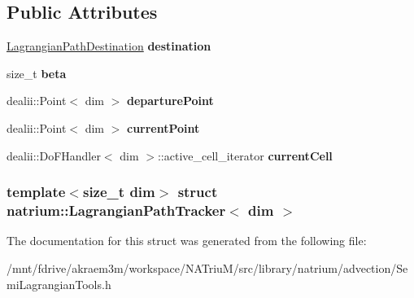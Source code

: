 \subsection*{Public Attributes}
\begin{DoxyCompactItemize}
\item 
\hypertarget{structnatrium_1_1LagrangianPathTracker_a64925522b60f5708255cc42423da9519}{
\hyperlink{structnatrium_1_1LagrangianPathDestination}{LagrangianPathDestination} {\bfseries destination}}
\label{structnatrium_1_1LagrangianPathTracker_a64925522b60f5708255cc42423da9519}

\item 
\hypertarget{structnatrium_1_1LagrangianPathTracker_af134bbbd443f6ad3eadf43b5c0439031}{
size\_\-t {\bfseries beta}}
\label{structnatrium_1_1LagrangianPathTracker_af134bbbd443f6ad3eadf43b5c0439031}

\item 
\hypertarget{structnatrium_1_1LagrangianPathTracker_aa1e9f15e1bf190fb2c3d06badd9159fb}{
dealii::Point$<$ dim $>$ {\bfseries departurePoint}}
\label{structnatrium_1_1LagrangianPathTracker_aa1e9f15e1bf190fb2c3d06badd9159fb}

\item 
\hypertarget{structnatrium_1_1LagrangianPathTracker_ab639e3055ca3f13259d6f5c553f49daa}{
dealii::Point$<$ dim $>$ {\bfseries currentPoint}}
\label{structnatrium_1_1LagrangianPathTracker_ab639e3055ca3f13259d6f5c553f49daa}

\item 
\hypertarget{structnatrium_1_1LagrangianPathTracker_a592f090b8bba783f5b49d57ed43a4da4}{
dealii::DoFHandler$<$ dim $>$::active\_\-cell\_\-iterator {\bfseries currentCell}}
\label{structnatrium_1_1LagrangianPathTracker_a592f090b8bba783f5b49d57ed43a4da4}

\end{DoxyCompactItemize}
\subsubsection*{template$<$size\_\-t dim$>$ struct natrium::LagrangianPathTracker$<$ dim $>$}



The documentation for this struct was generated from the following file:\begin{DoxyCompactItemize}
\item 
/mnt/fdrive/akraem3m/workspace/NATriuM/src/library/natrium/advection/SemiLagrangianTools.h\end{DoxyCompactItemize}
